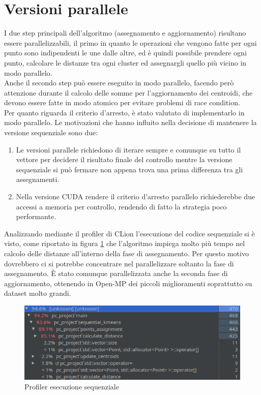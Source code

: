 \documentclass[10pt,twocolumn,letterpaper]{article}
\begin{document}
\section{Versioni parallele}
I due step principali dell'algoritmo (assegnamento e aggiornamento) risultano essere parallelizzabili, il primo in quanto le operazioni che vengono fatte per ogni punto sono indipendenti le une dalle altre, ed è quindi possibile prendere ogni punto, calcolare le distanze tra ogni cluster ed assegnargli quello più vicino in modo parallelo.\\
Anche il secondo step può essere eseguito in modo parallelo, facendo però attenzione durante il calcolo delle somme per l'aggiornamento dei centroidi, che devono essere fatte in modo atomico per evitare problemi di race condition.\\
Per quanto riguarda il criterio d'arresto, è stato valutato di implementarlo in modo parallelo. Le motivazioni che hanno influito nella decisione di mantenere la versione sequenziale sono due: 
\begin{enumerate}
	\item Le versioni parallele richiedono di iterare sempre e
comunque su tutto il vettore per decidere il risultato finale
del controllo mentre la versione sequenziale si può fermare non appena trova una prima differenza tra gli assegnamenti.
	\item Nella versione CUDA rendere il criterio d'arresto parallelo richiederebbe due accessi a memoria per controllo, rendendo di fatto la strategia poco performante. %
\end{enumerate}
Analizzando mediante il profiler di CLion l'esecuzione del codice sequenziale si è visto, come riportato in figura \ref{fig:profiler} che l'algoritmo impiega molto più tempo nel calcolo delle distanze all'interno della fase di assegnamento. Per questo motivo dovrebbero ci si potrebbe concentrare nel parallelizzare soltanto la fase di assegnamento. È stato comunque parallelizzata anche la seconda fase di aggiornamento, ottenendo in Open-MP dei piccoli miglioramenti soprattutto su dataset molto grandi.
\begin{figure}[h!]
	\centering
	\includegraphics[scale=0.35]{Profiler.png}
	\caption{Profiler esecuzione sequenziale}
	\label{fig:profiler}
\end{figure}
\end{document}
